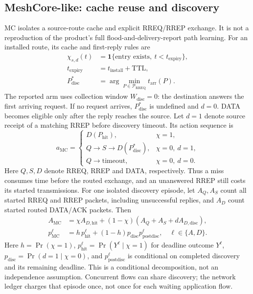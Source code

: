 \documentclass[conference,letterpaper,10pt]{IEEEtran}
\begin{document}
\subsection{MeshCore-like: cache reuse and discovery}
MC isolates a source-route cache and explicit RREQ/RREP exchange.
It is not a reproduction of the product's full flood-and-delivery-report
path learning. For an installed route, its cache and first-reply rules are
\begin{equation}
\begin{aligned}
\chi_{s,d}(t)&=\mathbf 1\{\text{entry exists},\ t<t_{\mathrm{expiry}}\},\\
t_{\mathrm{expiry}}&=t_{\mathrm{install}}+\mathrm{TTL},\\
P_{\mathrm{disc}}^*&=\arg\min_{P\in\mathcal P_{\mathrm{RREQ}}}
 t_{\mathrm{arr}}(P).
\end{aligned}
\label{eq:meshcore-cache}
\end{equation}
The reported arm uses collection window $W_{\mathrm{disc}}=0$:
the destination answers the first arriving request. If no request arrives,
$P_{\mathrm{disc}}^*$ is undefined and $d=0$. DATA becomes eligible
only after the reply reaches the source. Let $d=1$ denote source receipt of
a matching RREP before discovery timeout. Its action sequence is
\begin{equation}
a_{\mathrm{MC}}=
\begin{cases}
D(P_{\mathrm{hit}}),&\chi=1,\\
Q\to S\to D(P_{\mathrm{disc}}^*),
 &\chi=0,\ d=1,\\
Q\to\mathrm{timeout},&\chi=0,\ d=0.
\end{cases}
\label{eq:meshcore-mixture}
\end{equation}
Here $Q,S,D$ denote RREQ, RREP and DATA, respectively.
Thus a miss consumes time before the routed exchange, and an unanswered
RREP still costs its started transmissions. For one isolated discovery
episode, let $A_Q,A_S$ count all started RREQ and RREP packets, including
unsuccessful replies, and $A_D$ count started routed DATA/ACK packets. Then
\begin{equation}
\begin{aligned}
A_{\mathrm{MC}}&=\chi A_{D,\mathrm{hit}}+
 (1-\chi)(A_Q+A_S+dA_{D,\mathrm{disc}}),\\
p_{\mathrm{MC}}^\ell
 &=h\,p_{\mathrm{hit}}^\ell+
   (1-h)p_{\mathrm{disc}}p_{\mathrm{postdisc}}^\ell,
 \quad \ell\in\{A,D\}.
\end{aligned}
\label{eq:meshcore-cost}
\end{equation}
Here $h=\Pr(\chi=1)$, $p_{\mathrm{hit}}^\ell=\Pr(Y^\ell\mid\chi=1)$
for deadline outcome $Y^\ell$, $p_{\mathrm{disc}}=\Pr(d=1\mid\chi=0)$, and
$p_{\mathrm{postdisc}}^\ell$ is conditional on completed discovery and its
remaining deadline. This is a conditional decomposition, not an independence
assumption. Concurrent flows can share discovery; the network ledger charges
that episode once, not once for each waiting application flow.
\end{document}
